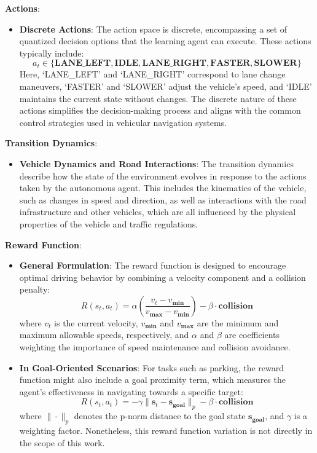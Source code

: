 \documentclass{article}
\begin{document}
\textbf{Actions}:
\begin{itemize}
  \item \textbf{Discrete Actions}: The action space is discrete, encompassing a set of quantized decision options that the learning agent can execute. These actions typically include:
    \[
    a_t \in \{\mathbf{LANE\_LEFT}, \mathbf{IDLE}, \mathbf{LANE\_RIGHT}, \mathbf{FASTER}, \mathbf{SLOWER}\}
    \]
  Here, `LANE\_LEFT' and `LANE\_RIGHT' correspond to lane change maneuvers, `FASTER' and `SLOWER' adjust the vehicle's speed, and `IDLE' maintains the current state without changes. The discrete nature of these actions simplifies the decision-making process and aligns with the common control strategies used in vehicular navigation systems.
\end{itemize}

\textbf{Transition Dynamics}:
\begin{itemize}
  \item \textbf{Vehicle Dynamics and Road Interactions}: The transition dynamics describe how the state of the environment evolves in response to the actions taken by the autonomous agent. This includes the kinematics of the vehicle, such as changes in speed and direction, as well as interactions with the road infrastructure and other vehicles, which are all influenced by the physical properties of the vehicle and traffic regulations.
\end{itemize}

\textbf{Reward Function}:
\begin{itemize}
  \item \textbf{General Formulation}: The reward function is designed to encourage optimal driving behavior by combining a velocity component and a collision penalty:
    \[
    R(s_t, a_t) = \alpha \left(\frac{v_t - v_{\mathbf{min}}}{v_{\mathbf{max}} - v_{\mathbf{min}}}\right) - \beta \cdot \mathbf{collision}
    \]
  where $v_t$ is the current velocity, $v_{\mathbf{min}}$ and $v_{\mathbf{max}}$ are the minimum and maximum allowable speeds, respectively, and $\alpha$ and $\beta$ are coefficients weighting the importance of speed maintenance and collision avoidance.
  
  \item \textbf{In Goal-Oriented Scenarios}: For tasks such as parking, the reward function might also include a goal proximity term, which measures the agent's effectiveness in navigating towards a specific target:
    \[
    R(s_t, a_t) = -\gamma \|\mathbf{s}_t - \mathbf{s}_{\mathbf{goal}}\|_p - \beta \cdot \mathbf{collision}
    \]
  where $\|\cdot\|_p$ denotes the p-norm distance to the goal state $\mathbf{s}_{\mathbf{goal}}$, and $\gamma$ is a weighting factor. Nonetheless, this reward function variation is not directly in the scope of this work.
\end{itemize}
\end{document}
